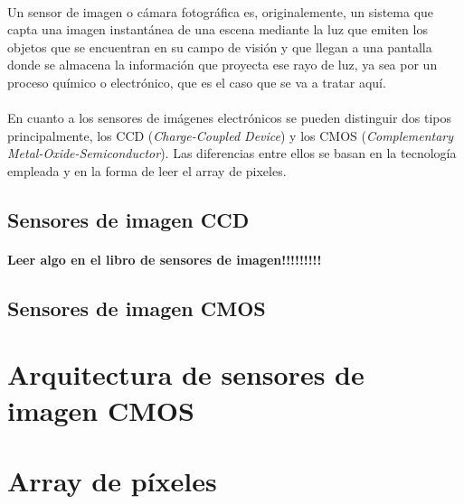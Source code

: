 \documentclass[12pt,a4paper,oneside,titlepage]{report}
\begin{document}
\paragraph{}
Un sensor de imagen o cámara fotográfica es, originalemente, un sistema que capta
una imagen instantánea de una escena mediante la luz que emiten los objetos que
se encuentran en su campo de visión y que llegan a una pantalla donde se almacena
la información que proyecta ese rayo de luz, ya sea por un proceso químico
o electrónico, que es el caso que se va a tratar aquí.

\paragraph{}
En cuanto a los sensores de imágenes electrónicos se pueden distinguir dos tipos
principalmente, los CCD (\textit{Charge-Coupled Device}) y los CMOS
(\textit{Complementary Metal-Oxide-Semiconductor}). Las diferencias entre ellos
se basan en la tecnología empleada y en la forma de leer el array de pixeles.

\subsection{Sensores de imagen CCD}

\paragraph{}
\textbf{Leer algo en el libro de sensores de imagen!!!!!!!!!}

\subsection{Sensores de imagen CMOS}

\paragraph{}


\section{Arquitectura de sensores de imagen CMOS}

\section{Array de píxeles}
\end{document}
